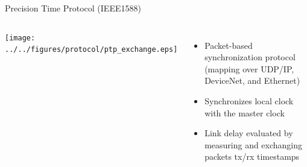 \documentclass[compress,red]{beamer}
\begin{document}
\begin{frame}{Precision Time Protocol (IEEE1588)}

\begin{columns}[c]
  \column{1.5in}
      \begin{center}
	\texttt{[image: ../../figures/protocol/ptp\_exchange.eps]}
      \end{center}
  \column{2.5in}
      \begin{itemize}
	  \item Packet-based synchronization protocol (mapping over UDP/IP, DeviceNet, and Ethernet)
	  \item Synchronizes local clock with the master clock
	  \item Link delay evaluated by measuring and exchanging packets tx/rx timestamps
      \end{itemize}
  \end{columns}

\end{frame}
% 
\end{document}
